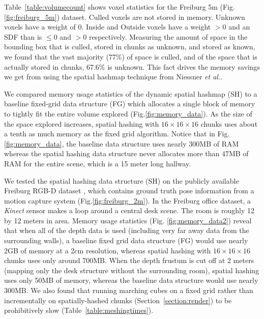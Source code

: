 \documentclass[conference]{IEEEtran}
\newcommand{\sref}[1]{Section~\ref{#1}}
\newcommand{\figref}[1]{Fig.\ref{#1}}
\newcommand{\tabref}[1]{Table~\ref{#1}}
\newcommand{\naive}{baseline\xspace}
\newcommand{\etal}{\textit{et al.}\xspace}
\begin{document}
\tabref{table:volumecount} shows voxel statistics for the Freiburg 5m
(\figref{fig:freiburg_5m}) dataset. Culled voxels are not stored in  memory.
Unknown voxels have a weight of 0. Inside and Outside voxels have a weight $>
0$ and an SDF than is $\leq 0$ and $> 0$ respectively. Measuring the amount of
space in the bounding box that is culled, stored in chunks as unknown, and
stored as known, we found that the vast majority (77\%) of space is culled, and
of the space that is actually stored in chunks, 67.6\% is unknown. This fact
drives the memory savings we get from using the spatial hashmap
technique from Niessner \etal \cite{NiessnerHashing}.

We compared memory usage statistics of the dynamic spatial hashmap (SH) to
a \naive fixed-grid data structure (FG) which allocates a single block of memory to
tightly fit the entire volume explored (\figref{fig:memory_data}). As the size of the space
explored increases,  spatial hashing  with $16 \times 16 \times
16$ chunks uses about a tenth as much memory as the fixed grid algorithm. Notice
that in \figref{fig:memory_data}, the \naive data structure uses nearly 300MB of RAM 
whereas the spatial hashing data structure never allocates more than 47MB of RAM
for the entire scene, which is a 15 meter long hallway.

We tested the spatial hashing data structure (SH) on the publicly available Freiburg
RGB-D dataset \cite{FREIBURG}, which contains ground truth pose information from a motion
capture system (\figref{fig:freiburg_2m}). In the Freiburg office dataset, a
\textit{Kinect} sensor makes a loop around a central desk scene. The room is
roughly 12 by 12 meters in area.  Memory usage statistics (Fig.
\ref{fig:memory_data2}) reveal that when all of the depth data is used
(including very far away data from the surrounding walls), a \naive fixed grid
data structure (FG) would use nearly 2GB of memory at a 2cm resolution, whereas
spatial hashing with $16 \times 16 \times 16$ chunks uses only around 700MB.
When the depth frustum is cut off at 2 meters (mapping only the desk structure
without the surrounding room), spatial hashing uses only 50MB of memory, whereas
the \naive data structure would use nearly 300MB. We also found that running marching
cubes on a fixed grid rather than incrementally on spatially-hashed chunks
(\sref{section:render}) to be prohibitively slow (\tabref{table:meshingtimes}). 
\end{document}
